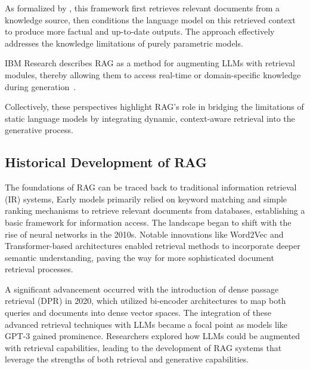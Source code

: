 As formalized by \citep{lewis2020retrieval}, this framework first retrieves relevant documents from a knowledge source, then conditions the language model on this retrieved context to produce more factual and up-to-date outputs. The approach effectively addresses the knowledge limitations of purely parametric models.

IBM Research \citep{ibm2024} describes RAG as a method for augmenting LLMs with retrieval modules, thereby allowing them to access real-time or domain-specific knowledge during generation~.  

Collectively, these perspectives highlight RAG's role in bridging the limitations of static language models by integrating dynamic, context-aware retrieval into the generative process.

\subsection{Historical Development of RAG}
The foundations of RAG can be traced back to traditional information retrieval (IR) systems,  Early models primarily relied on keyword matching and simple ranking mechanisms to retrieve relevant documents from databases, establishing a basic framework for information access. The landscape began to shift with the rise of neural networks in the 2010s\citep{gao2024retrieval}. Notable innovations like Word2Vec and Transformer-based architectures enabled retrieval methods to incorporate deeper semantic understanding, paving the way for more sophisticated document retrieval processes.

A significant advancement occurred with the introduction of dense passage retrieval (DPR) in 2020, which utilized bi-encoder architectures to map both queries and documents into dense vector spaces\citep{gao2024retrieval}. 
The integration of these advanced retrieval techniques with LLMs became a focal point as models like GPT-3 gained prominence. Researchers explored how LLMs could be augmented with retrieval capabilities, leading to the development of RAG systems that leverage the strengths of both retrieval and generative capabilities.
